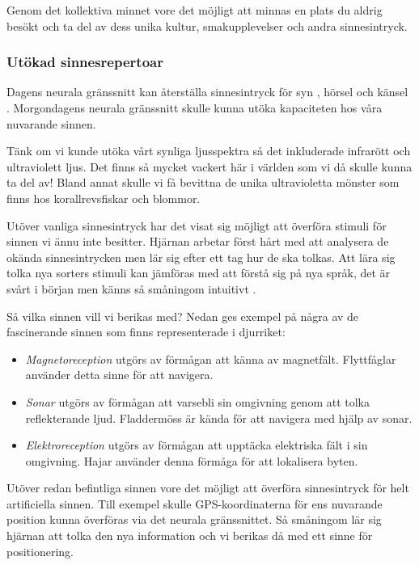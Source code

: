 \documentclass[12pt, a4paper]{article}
\begin{document}
Genom det kollektiva minnet vore det möjligt att minnas en plats du aldrig besökt och ta del av dess unika kultur, smakupplevelser och andra sinnesintryck.



\subsubsection{Utökad sinnesrepertoar}

Dagens neurala gränssnitt kan återställa sinnesintryck för syn \cite{sight1}, hörsel \cite{sound} och känsel \cite{touch}. Morgondagens neurala gränssnitt skulle kunna utöka kapaciteten hos våra nuvarande sinnen.

Tänk om vi kunde utöka vårt synliga ljusspektra så det inkluderade infrarött och ultraviolett ljus. Det finns så mycket vackert här i världen som vi då skulle kunna ta del av! Bland annat skulle vi få bevittna de unika ultravioletta mönster som finns hos korallrevsfiskar \cite{uv_patterns} och blommor.

Utöver vanliga sinnesintryck har det visat sig möjligt att överföra stimuli för sinnen vi ännu inte besitter. Hjärnan arbetar först hårt med att analysera de okända sinnesintrycken men lär sig efter ett tag hur de ska tolkas. Att lära sig tolka nya sorters stimuli kan jämföras med att förstå sig på nya språk, det är svårt i början men känns så småningom intuitivt \cite{learn_sense}.

Så vilka sinnen vill vi berikas med? Nedan ges exempel på några av de fascinerande sinnen som finns representerade i djurriket:

\begin{itemize}
	\item \textit{Magnetoreception} utgörs av förmågan att känna av magnetfält. Flyttfåglar använder detta sinne för att navigera.
	\item \textit{Sonar} utgörs av förmågan att varsebli sin omgivning genom att tolka reflekterande ljud. Fladdermöss är kända för att navigera med hjälp av sonar.
	\item \textit{Elektroreception} utgörs av förmågan att upptäcka elektriska fält i sin omgivning. Hajar använder denna förmåga för att lokalisera byten.
\end{itemize}

Utöver redan befintliga sinnen vore det möjligt att överföra sinnesintryck för helt artificiella sinnen. Till exempel skulle GPS-koordinaterna för ens nuvarande position kunna överföras via det neurala gränssnittet. Så småningom lär sig hjärnan att tolka den nya information och vi berikas då med ett sinne för positionering.
\end{document}
